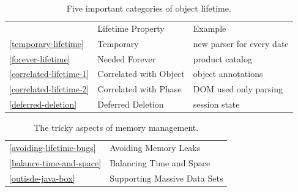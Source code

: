 \begin{table}
\centering
	\begin{tabular}{lp{}p{}}
	\toprule  & Lifetime Property & Example \\ \cmidrule(r){2-2} \cmidrule(l){3-3}
	\autoref{temporary-lifetime}  & {Temporary} & new
	parser for every date
	\\
	\autoref{forever-lifetime} & {Needed Forever} & product catalog
	\\
	\autoref{correlated-lifetime-1} & {Correlated with Object}
	& object annotations
	\\
	\autoref{correlated-lifetime-2} & {Correlated with Phase} &
	DOM used only parsing
	\\
	\autoref{deferred-deletion} & {Deferred Deletion} &
	session state \\
	\bottomrule
	\end{tabular}
	\caption{Five important categories of object lifetime.}
	\label{tab:five-lifetimes}
\end{table}


\begin{table}
\centering
	\begin{tabular}{ll} \toprule
    	\autoref{avoiding-lifetime-bugs} & {Avoiding Memory Leaks} \\
    	\autoref{balance-time-and-space} & {Balancing Time and Space} \\
    	\autoref{outisde-java-box} & {Supporting Massive Data Sets}  	\\
        \bottomrule
    \end{tabular}
	\caption{The tricky aspects of memory management.}
	\label{tab:tricky-memory-management}
\end{table}

